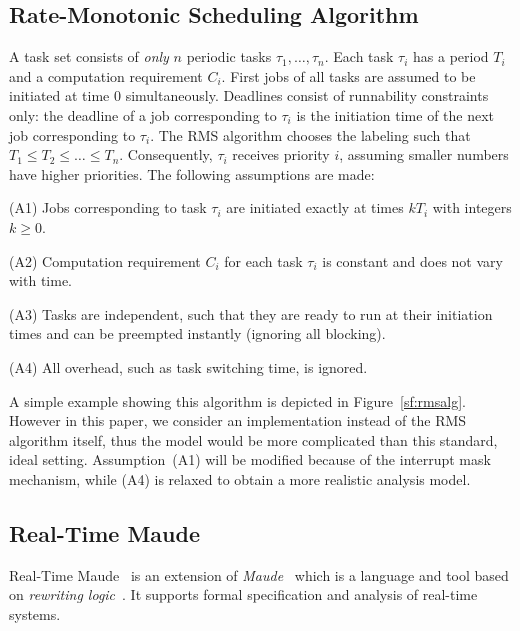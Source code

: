 \documentclass[10pt,journal]{IEEEtran}
\begin{document}
\subsection{Rate-Monotonic Scheduling Algorithm}
\label{ss:rms}
A task set consists of \emph{only} $n$ periodic tasks
$\tau_1,\ldots,\tau_n$. Each task $\tau_i$ has a period $T_i$ and a
computation requirement $C_i$. First jobs of all tasks are assumed to
be initiated at time $0$ simultaneously.  Deadlines consist of
runnability constraints only: the deadline of a job corresponding to
$\tau_i$ is the initiation time of the next job corresponding to
$\tau_i$.  The RMS algorithm chooses the labeling such that $T_1\le
T_2\le \ldots \le T_n$. Consequently, $\tau_i$ receives priority $i$,
assuming smaller numbers have higher priorities. The following
assumptions are made:

(A1) Jobs corresponding to task $\tau_i$ are initiated exactly at
times $kT_i$ with integers $k\ge 0$.

(A2) Computation requirement $C_i$ for each task $\tau_i$ is constant
and does not vary with time.

(A3) Tasks are independent, such that they are ready to run at their
initiation times and can be preempted instantly (ignoring all
blocking).

(A4) All overhead, such as task switching time, is ignored.

A simple example showing this algorithm is depicted in
Figure~\ref{sf:rmsalg}. However in this paper, we consider an
implementation instead of the RMS algorithm itself, thus the model
would be more complicated than this standard, ideal
setting. Assumption~(A1) will be modified because of the interrupt
mask mechanism, while (A4) is relaxed to obtain a more realistic
analysis model.

\subsection{Real-Time Maude}
Real-Time Maude~\cite{DBLP:journals/lisp/OlveczkyM07} is an extension
of \emph{Maude}~\cite{DBLP:journals/tcs/ClavelDELMMQ02} which is a
language and tool based on \emph{rewriting
  logic}~\cite{DBLP:journals/jlp/Meseguer12}.  It supports formal
specification and analysis of real-time systems.
\end{document}
